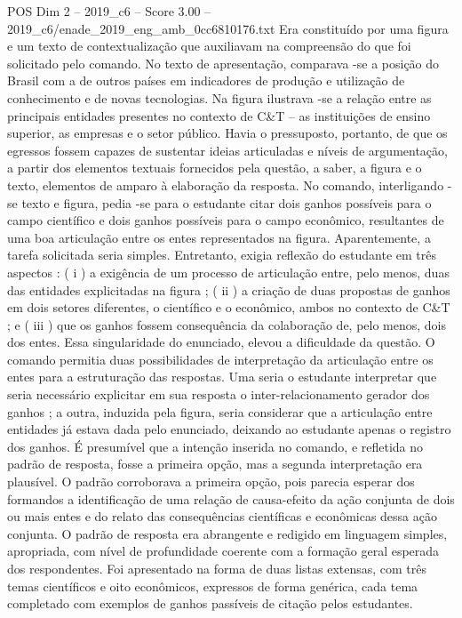 \begin{textsample}{POS Dim 2 – 2019\_c6 – Score 3.00 – 2019\_c6/enade\_2019\_eng\_amb\_0cc6810176.txt}
Era constituído por uma figura e um texto de contextualização que auxiliavam na compreensão do que foi solicitado pelo comando.
No texto de apresentação, comparava -se a posição do Brasil com a de outros países em indicadores de produção e utilização de conhecimento e de novas tecnologias.
Na figura ilustrava -se a relação entre as principais entidades presentes no contexto de C\&T – as instituições de ensino superior, as empresas e o setor público.
Havia o pressuposto, portanto, de que os egressos fossem capazes de sustentar ideias articuladas e níveis de argumentação, a partir dos elementos textuais fornecidos pela questão, a saber, a figura e o texto, elementos de amparo à elaboração da resposta.
No comando, interligando -se texto e figura, pedia -se para o estudante citar dois ganhos possíveis para o campo científico e dois ganhos possíveis para o campo econômico, resultantes de uma boa articulação entre os entes representados na figura.
Aparentemente, a tarefa solicitada seria simples.
Entretanto, exigia reflexão do estudante em três aspectos : ( i ) a exigência de um processo de articulação entre, pelo menos, duas das entidades explicitadas na figura ; ( ii ) a criação de duas propostas de ganhos em dois setores diferentes, o científico e o econômico, ambos no contexto de C\&T ; e ( iii ) que os ganhos fossem consequência da colaboração de, pelo menos, dois dos entes.
Essa singularidade do enunciado, elevou a dificuldade da questão.
O comando permitia duas possibilidades de interpretação da articulação entre os entes para a estruturação das respostas.
Uma seria o estudante interpretar que seria necessário explicitar em sua resposta o inter-relacionamento gerador dos ganhos ; a outra, induzida pela figura, seria considerar que a articulação entre entidades já estava dada pelo enunciado, deixando ao estudante apenas o registro dos ganhos.
É presumível que a intenção inserida no comando, e refletida no padrão de resposta, fosse a primeira opção, mas a segunda interpretação era plausível.
O padrão corroborava a primeira opção, pois parecia esperar dos formandos a identificação de uma relação de causa-efeito da ação conjunta de dois ou mais entes e do relato das consequências científicas e econômicas dessa ação conjunta.
O padrão de resposta era abrangente e redigido em linguagem simples, apropriada, com nível de profundidade coerente com a formação geral esperada dos respondentes.
Foi apresentado na forma de duas listas extensas, com três temas científicos e oito econômicos, expressos de forma genérica, cada tema completado com exemplos de ganhos passíveis de citação pelos estudantes.

\end{textsample}
